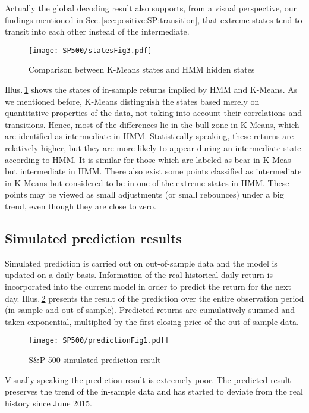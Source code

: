 Actually the global decoding result also supports, from a visual perspective, 
our findings mentioned in Sec.\,\ref{sec:positive:SP:transition},  
that extreme states tend to transit into each other instead of the intermediate.

        \begin{figure}[!hbt]
        \center
        \texttt{[image: SP500/statesFig3.pdf]}
        \caption{Comparison between K-Means states and HMM hidden states}
        \label{fig:SP:diffstates}
        \end{figure}
Illus.\,\ref{fig:SP:diffstates} shows the states of in-sample returns implied by HMM and K-Means.
As we mentioned before, K-Means distinguish the states based merely on 
quantitative properties of the data, not taking into account their correlations and transitions.
Hence, most of the differences lie in the bull zone in K-Means, 
which are identified as intermediate in HMM.
Statistically speaking, these returns are relatively higher,
but they are more likely to appear during an intermediate state according to HMM.
It is similar for those which are labeled as bear in K-Meas but intermediate in HMM.
There also exist some points classified as intermediate in K-Means 
but considered to be in one of the extreme states in HMM.
These points may be viewed as small adjustments (or small rebounces) under a big trend,
even though they are close to zero.


\subsection{Simulated prediction results}
\label{sec:positive:SP:prediction}
Simulated prediction is carried out on out-of-sample data and 
the model is updated on a daily basis.
Information of the real historical daily return is incorporated into 
the current model in order to predict the return for the next day.
Illus.\,\ref{fig:SP:predictionall} presents the result of the prediction
over the entire observation period (in-sample and out-of-sample).
Predicted returns are cumulatively summed and taken exponential, 
multiplied by the first closing price of the out-of-sample data.

        \begin{figure}[!hbt]
        \center
        \texttt{[image: SP500/predictionFig1.pdf]}
        \caption{S\&P 500 simulated prediction result}
        \label{fig:SP:predictionall}
        \end{figure}
Visually speaking the prediction result is extremely poor.
The predicted result preserves the trend of the in-sample data
and has started to deviate from the real history since June 2015.

